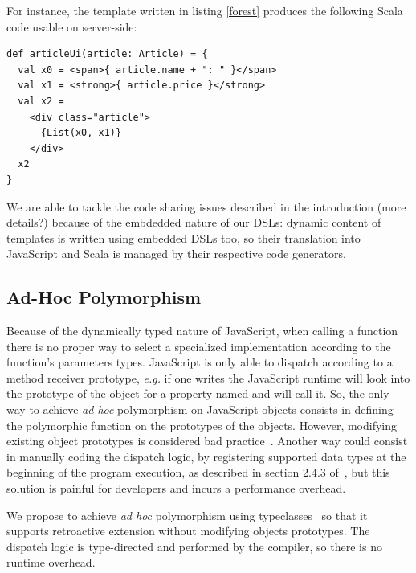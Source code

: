 \documentclass[preprint]{sigplanconf}
\newcommand{\eg}{\emph{e.g.}}
\begin{document}
For instance, the template written in listing \ref{forest} produces the following Scala code usable on
server-side:

\begin{lstlisting}
def articleUi(article: Article) = {
  val x0 = <span>{ article.name + ": " }</span>
  val x1 = <strong>{ article.price }</strong>
  val x2 =
    <div class="article">
      {List(x0, x1)}
    </div>
  x2
}
\end{lstlisting}

We are able to tackle the code sharing issues described in the introduction (more details?) because of the embdedded
nature of our DSLs: dynamic content of templates is written using embedded DSLs too, so their translation into
JavaScript and Scala is managed by their respective code generators.

\subsection{Ad-Hoc Polymorphism}

Because of the dynamically typed nature of JavaScript, when calling a function there is no proper way to select a
specialized implementation according to the function’s parameters types. JavaScript is only able to dispatch
according to a method receiver prototype, \eg{} if one writes  the JavaScript runtime will look into
the prototype of the  object for a property named  and will call it. So, the only way to achieve
\emph{ad hoc} polymorphism on JavaScript objects consists in defining the polymorphic function on the prototypes of
the objects. However, modifying existing object prototypes is considered bad
practice~\cite{Zakas12_MaintainableJs}. Another way could consist in manually coding the dispatch logic, by
registering supported data types at the beginning of the program execution, as described in section 2.4.3
of~\cite{Abelson83_SICP}, but this solution is painful for developers and incurs a performance overhead.

We propose to achieve \emph{ad hoc} polymorphism using
typeclasses~\cite{Wadler89_AdhocPolymorphism,Odersky06_Typeclasses,Oliveira10_Typeclasses} so that it supports
retroactive extension without modifying objects prototypes. The dispatch logic is type-directed and performed by the
compiler, so there is no runtime overhead.
\end{document}
